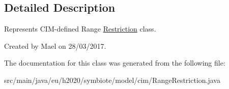 \subsection{Detailed Description}
Represents C\+I\+M-\/defined Range \hyperlink{classeu_1_1h2020_1_1symbiote_1_1model_1_1cim_1_1Restriction}{Restriction} class.

Created by Mael on 28/03/2017. 

The documentation for this class was generated from the following file\+:\begin{DoxyCompactItemize}
\item 
src/main/java/eu/h2020/symbiote/model/cim/Range\+Restriction.\+java\end{DoxyCompactItemize}
